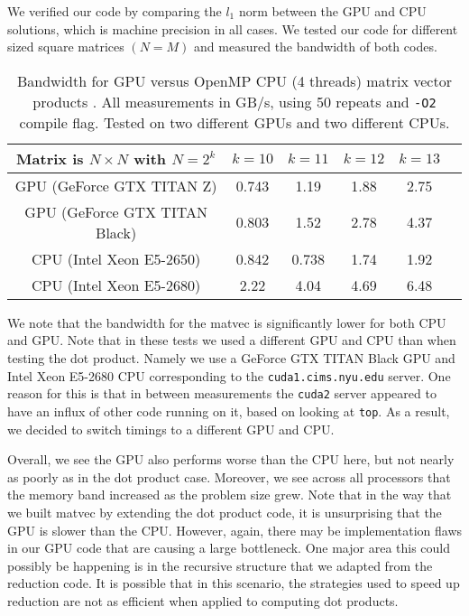 \documentclass[10pt]{article}
\begin{document}
\begin{enumerate}
We verified our code by comparing the $l_{1}$ norm between the GPU and CPU solutions, which is machine precision in all cases. We tested our code for different sized square matrices $(N=M)$ and measured the bandwidth of both codes.
\begin{table}[!ht]
\centering
\caption{Bandwidth for GPU versus  OpenMP CPU (4 threads) matrix vector products . All measurements in GB/s, using 50 repeats and \texttt{-O2} compile flag. Tested on two different GPUs and two different CPUs.}
\begin{tabular}{| c | c | c | c | c | c |}
\hline
Matrix is $N \times N$ with $N=2^{k}$ & $k=10$ & $k=11$  & $k=12$ & $k=13$  \\
\hline
GPU (GeForce GTX TITAN Z) & 0.743 & 1.19 & 1.88 & 2.75  \\
GPU (GeForce GTX TITAN Black) & 0.803 & 1.52 & 2.78 & 4.37  \\
CPU (Intel Xeon E5-2650) & 0.842 & 0.738 & 1.74 & 1.92 \\
CPU (Intel Xeon E5-2680) & 2.22 & 4.04 & 4.69 & 6.48 \\
\hline
\end{tabular}
\label{matvec}
\end{table}

We note that the bandwidth for the matvec is significantly lower for both CPU and GPU. Note that in these tests we used a different GPU and CPU than when testing the dot product. Namely we use a GeForce GTX TITAN Black GPU and Intel Xeon E5-2680 CPU corresponding to the \texttt{cuda1.cims.nyu.edu} server. One reason for this is that in between measurements the \texttt{cuda2} server appeared to have an influx of other code running on it, based on looking at \texttt{top}. As a result, we decided to switch timings to a different GPU and CPU.

Overall, we see the GPU also performs worse than the CPU here, but not nearly as poorly as in the dot product case. Moreover, we see across all processors that the memory band increased as the problem size grew. Note that in the way that we built matvec by extending the dot product code, it is unsurprising that the GPU is slower than the CPU. However, again, there may be implementation flaws in our GPU code that are causing a large bottleneck. One major area this could possibly be happening is in the recursive structure that we adapted from the reduction code. It is possible that in this scenario, the strategies used to speed up reduction are not as efficient when applied to computing dot products.



\end{enumerate}
\end{document}
